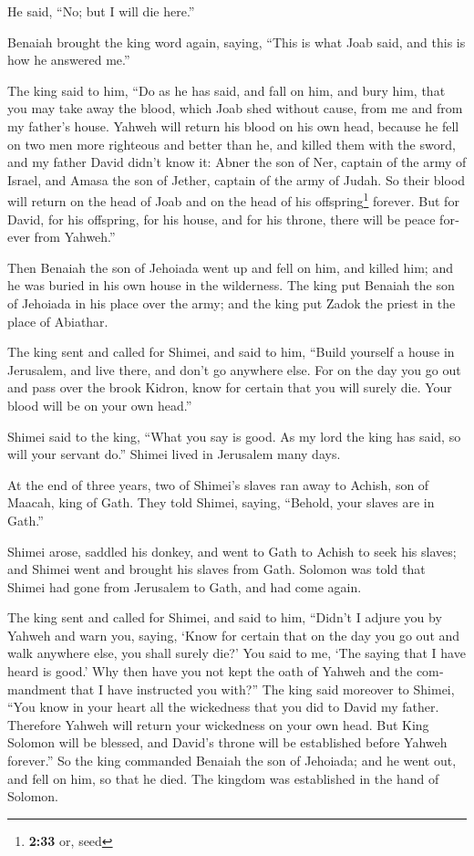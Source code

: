 \begin{paracol}{2}
\begin{otherlanguage}{english}
He said, ``No; but I will die here.''

Benaiah brought the king word again, saying, ``This is what Joab said,
and this is how he answered me.''

 The king said to him, ``Do as he has said, and fall on
him, and bury him, that you may take away the blood, which Joab shed
without cause, from me and from my father's house. 
Yahweh will return his blood on his own head, because he fell on two men
more righteous and better than he, and killed them with the sword, and
my father David didn't know it: Abner the son of Ner, captain of the
army of Israel, and Amasa the son of Jether, captain of the army of
Judah.  So their blood will return on the head of Joab
and on the head of his offspring\footnote{\textbf{2:33} or, seed}
forever. But for David, for his offspring, for his house, and for his
throne, there will be peace forever from Yahweh.''

 Then Benaiah the son of Jehoiada went up and fell on
him, and killed him; and he was buried in his own house in the
wilderness.  The king put Benaiah the son of Jehoiada in
his place over the army; and the king put Zadok the priest in the place
of Abiathar.

 The king sent and called for Shimei, and said to him,
``Build yourself a house in Jerusalem, and live there, and don't go
anywhere else.  For on the day you go out and pass over
the brook Kidron, know for certain that you will surely die. Your blood
will be on your own head.''

 Shimei said to the king, ``What you say is good. As my
lord the king has said, so will your servant do.'' Shimei lived in
Jerusalem many days.

 At the end of three years, two of Shimei's slaves ran
away to Achish, son of Maacah, king of Gath. They told Shimei, saying,
``Behold, your slaves are in Gath.''

 Shimei arose, saddled his donkey, and went to Gath to
Achish to seek his slaves; and Shimei went and brought his slaves from
Gath.  Solomon was told that Shimei had gone from
Jerusalem to Gath, and had come again.

 The king sent and called for Shimei, and said to him,
``Didn't I adjure you by Yahweh and warn you, saying, `Know for certain
that on the day you go out and walk anywhere else, you shall surely
die?' You said to me, `The saying that I have heard is good.'
 Why then have you not kept the oath of Yahweh and the
commandment that I have instructed you with?''  The king
said moreover to Shimei, ``You know in your heart all the wickedness
that you did to David my father. Therefore Yahweh will return your
wickedness on your own head.  But King Solomon will be
blessed, and David's throne will be established before Yahweh forever.''
 So the king commanded Benaiah the son of Jehoiada; and
he went out, and fell on him, so that he died. The kingdom was
established in the hand of Solomon.


\end{otherlanguage}
\end{paracol}
